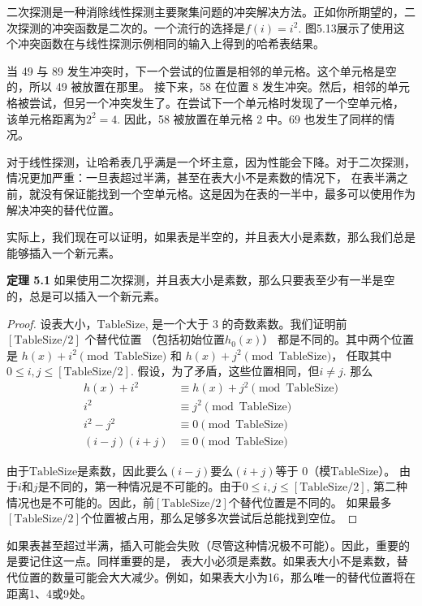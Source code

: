 \documentclass[a4paper]{ctexart}
\theoremstyle{definition}
\theoremstyle{definition}
\begin{document}
二次探测是一种消除线性探测主要聚集问题的冲突解决方法。正如你所期望的，二次探测的冲突函数是二次的。一个流行的选择是$f(i) = i^2$. 
图5.13展示了使用这个冲突函数在与线性探测示例相同的输入上得到的哈希表结果。

当 49 与 89 发生冲突时，下一个尝试的位置是相邻的单元格。这个单元格是空的，所以 49 被放置在那里。
接下来，58 在位置 8 发生冲突。然后，相邻的单元格被尝试，但另一个冲突发生了。在尝试下一个单元格时发现了一个空单元格，
该单元格距离为$2^2 = 4$. 因此，58 被放置在单元格 2 中。69 也发生了同样的情况。

对于线性探测，让哈希表几乎满是一个坏主意，因为性能会下降。对于二次探测，情况更加严重：一旦表超过半满，甚至在表大小不是素数的情况下，
在表半满之前，就没有保证能找到一个空单元格。这是因为在表的一半中，最多可以使用作为解决冲突的替代位置。

实际上，我们现在可以证明，如果表是半空的，并且表大小是素数，那么我们总是能够插入一个新元素。

\noindent \textbf{定理 5.1} 如果使用二次探测，并且表大小是素数，那么只要表至少有一半是空的，总是可以插入一个新元素。

\begin{proof}
设表大小，$\text{TableSize}$, 是一个大于 $3$ 的奇数素数。我们证明前 $[\text{TableSize}/2]$ 个替代位置
（包括初始位置$h_0(x)$）
都是不同的。其中两个位置是 $h(x) + i^2 \pmod{\text{TableSize}}$ 和 $h(x) + j^2 \pmod{\text{TableSize}}$，
任取其中$0 \leq i, j \leq [\text{TableSize}/2]$. 假设，为了矛盾，这些位置相同，但$i \neq j$. 那么
\begin{align*}
  h(x) + i^2 &\equiv h(x) + j^2 \pmod{\text{TableSize}} \\
  i^2 &\equiv j^2 \pmod{\text{TableSize}} \\
  i^2 - j^2 &\equiv 0 \pmod{\text{TableSize}} \\
  (i - j)(i + j) &\equiv 0 \pmod{\text{TableSize}}
\end{align*}
  
由于$\text{TableSize}$是素数，因此要么$(i - j)$要么$(i + j)$等于 $0$（模$\text{TableSize}$）。
由于$i$和$j$是不同的，第一种情况是不可能的。由于$0 \leq i, j \leq [\text{TableSize}/2]$, 
第二种情况也是不可能的。因此，前$[\text{TableSize}/2]$个替代位置是不同的。
如果最多$[\text{TableSize}/2]$个位置被占用，那么足够多次尝试后总能找到空位。
\end{proof}

如果表甚至超过半满，插入可能会失败（尽管这种情况极不可能）。因此，重要的是要记住这一点。同样重要的是，
表大小必须是素数。如果表大小不是素数，替代位置的数量可能会大大减少。例如，如果表大小为16，那么唯一的替代位置将在距离1、4或9处。
\end{document}
